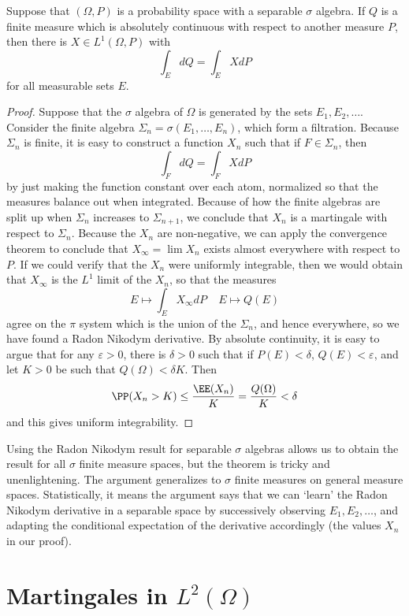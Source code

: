 \begin{theorem}
    Suppose that $(\Omega,P)$ is a probability space with a separable $\sigma$ algebra. If $Q$ is a finite measure which is absolutely continuous with respect to another measure $P$, then there is $X \in L^1(\Omega,P)$ with
    \[ \int_E dQ = \int_E X dP \]
    for all measurable sets $E$.
\end{theorem}
\begin{proof}
    Suppose that the $\sigma$ algebra of $\Omega$ is generated by the sets $E_1, E_2, \dots$. Consider the finite algebra $\Sigma_n = \sigma(E_1, \dots, E_n)$, which form a filtration. Because $\Sigma_n$ is finite, it is easy to construct a function $X_n$ such that if $F \in \Sigma_n$, then
    \[ \int_F dQ = \int_F X dP \]
    by just making the function constant over each atom, normalized so that the measures balance out when integrated. Because of how the finite algebras are split up when $\Sigma_n$ increases to $\Sigma_{n+1}$, we conclude that $X_n$ is a martingale with respect to $\Sigma_n$. Because the $X_n$ are non-negative, we can apply the convergence theorem to conclude that $X_\infty = \lim X_n$ exists almost everywhere with respect to $P$. If we could verify that the $X_n$ were uniformly integrable, then we would obtain that $X_\infty$ is the $L^1$ limit of the $X_n$, so that the measures
    \[ E \mapsto \int_E X_\infty dP\ \ \ \ \ E \mapsto Q(E) \]
    agree on the $\pi$ system which is the union of the $\Sigma_n$, and hence everywhere, so we have found a Radon Nikodym derivative. By absolute continuity, it is easy to argue that for any $\varepsilon > 0$, there is $\delta > 0$ such that if $P(E) < \delta$, $Q(E) < \varepsilon$, and let $K > 0$ be such that $Q(\Omega) < \delta K$. Then
    \[ \PP(X_n > K) \leq \frac{\EE(X_n)}{K} = \frac{Q(\Omega)}{K} < \delta \]
    and this gives uniform integrability.
\end{proof}

Using the Radon Nikodym result for separable $\sigma$ algebras allows us to obtain the result for all $\sigma$ finite measure spaces, but the theorem is tricky and unenlightening. The argument generalizes to $\sigma$ finite measures on general measure spaces. Statistically, it means the argument says that we can `learn' the Radon Nikodym derivative in a separable space by successively observing $E_1, E_2, \dots$, and adapting the conditional expectation of the derivative accordingly (the values $X_n$ in our proof).

\section{Martingales in $L^2(\Omega)$}

